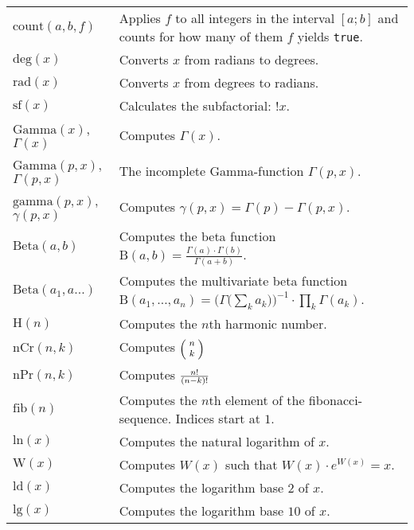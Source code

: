 \documentclass[10pt]{article}
\newcommand{\tabgap}{\vspace{3mm}\\}
\begin{document}
\begin{longtable}{p{}p{}}
        $ \mathrm{count}(a, b, f) $                & Applies $ f $ to all integers in the interval $ [a;b] $ and counts for how many of them $ f $ yields \verb|true|. \tabgap
        $ \mathrm{deg}(x) $                        & Converts $ x $ from radians to degrees. \\
        $ \mathrm{rad}(x) $                        & Converts $ x $ from degrees to radians. \tabgap
        $ \mathrm{sf}(x) $                         & Calculates the subfactorial: $ !x $. \\
        $ \mathrm{Gamma}(x) $, $ \Gamma(x) $       & Computes $ \Gamma(x) $. \\
        $ \mathrm{Gamma}(p, x) $, $ \Gamma(p, x) $ & The incomplete Gamma-function $ \Gamma(p, x) $. \\
        $ \mathrm{gamma}(p, x) $, $ \gamma(p, x) $ & Computes $ \gamma(p, x) = \Gamma(p) - \Gamma(p, x) $. \\
        $ \mathrm{Beta}(a, b) $                    & Computes the beta function $ \mathrm{B}(a, b) = \frac{\Gamma(a) \cdot \Gamma(b)}{\Gamma(a + b)} $. \\
        $ \mathrm{Beta}(a_1, a...) $               & Computes the multivariate beta function $ \mathrm{B}(a_1, \dots, a_n) = \Big(\Gamma\big(\sum_k a_k\big)\Big)^{-1} \cdot \prod_k \Gamma(a_k) $. \\
        $ \mathrm{H}(n) $                          & Computes the $ n $th harmonic number. \tabgap
        $ \mathrm{nCr}(n, k) $                     & Computes $ \footnotesize\Bigl(\kern-2\nulldelimiterspace\begin{array}{c}n\\k\end{array}\kern-2\nulldelimiterspace\Bigr) $ \\
        $ \mathrm{nPr}(n, k) $                     & Computes $ \footnotesize\frac{n!}{(n-k)!} $ \\
        $ \mathrm{fib}(n) $                        & Computes the $ n $th element of the fibonacci-sequence. Indices start at $ 1 $. \\
        $ \mathrm{ln}(x) $                         & Computes the natural logarithm of $ x $. \\
        $ \mathrm{W}(x) $                          & Computes $ W(x) $ such that $ W(x) \cdot e^{W(x)} = x $. \\
        $ \mathrm{ld}(x) $                         & Computes the logarithm base $ 2 $ of $ x $. \\
        $ \mathrm{lg}(x) $                         & Computes the logarithm base $ 10 $ of $ x $. \\

\end{longtable}
\end{document}
